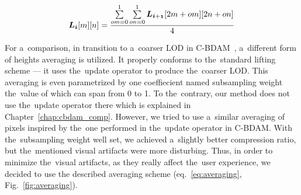 \begin{equation}
\label{eq:averaging}
\lnorm{i}[m][n] = \frac{\sum\limits_{om=0}^{1}\sum\limits_{on=0}^{1}\lnorm{i+1}[2m + om][2n + on]}{4}
\end{equation}

For a~comparison, in transition to a~coarser LOD in C-BDAM~\cite{cbdam}, a~different form of heights averaging is utilized. It properly conforms to the~standard lifting scheme --- it uses the~update operator to produce the~coarser LOD.  This averaging is even parametrized by one coeffiecient named subsampling weight the~value of which can span from 0 to 1. To the~contrary, our method does not use the~update operator there which is explained in Chapter~\ref{chap:cbdam_comp}. However, we tried to use a~similar averaging of pixels inspired by the~one performed in the~update operator in C-BDAM. With the~subsampling weight well set, we achieved a~slightly better compression ratio, but the~mentioned visual artifacts were more disturbing. Thus, in order to minimize the~visual artifacts, as they really affect the~user experience, we decided to use the described averaging scheme (eq.~\ref{eq:averaging}, Fig.~\ref{fig:averaging}).

\newcommand{\vspacemip}[0]{\vspace{0.08cm}}

